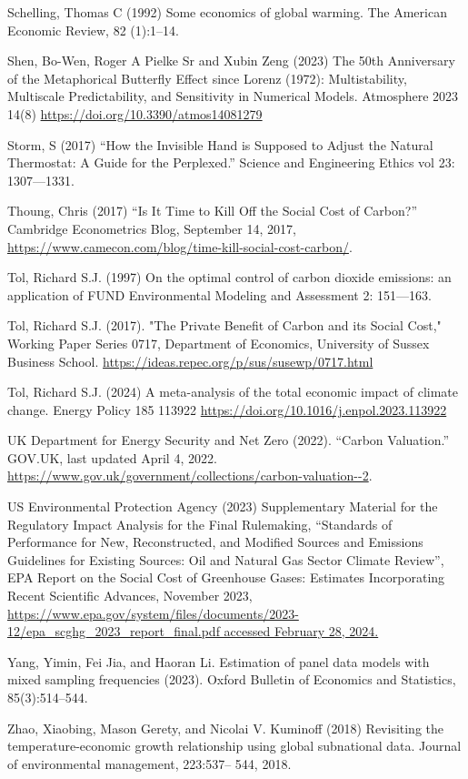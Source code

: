 \documentclass[12pt,paper=a4,DIV=12,parskip=never,chapterprefix=false,headings=standardclasses]{scrreprt}
\begin{document}
Schelling, Thomas C (1992) Some economics of global warming. The American Economic Review, 82
(1):1–14.

Shen, Bo-Wen, Roger A Pielke Sr and Xubin Zeng (2023) The 50th Anniversary of the Metaphorical
Butterfly Effect since Lorenz (1972): Multistability, Multiscale Predictability, and Sensitivity in
Numerical Models. Atmosphere 2023 14(8) \url{https://doi.org/10.3390/atmos14081279}

Storm, S (2017) “How the Invisible Hand is Supposed to Adjust the Natural Thermostat: A Guide for the
Perplexed.” Science and Engineering Ethics vol 23: 1307—1331.

Thoung, Chris (2017) “Is It Time to Kill Off the Social Cost of Carbon?” Cambridge Econometrics Blog,
September 14, 2017, \url{https://www.camecon.com/blog/time-kill-social-cost-carbon/}.

Tol, Richard S.J. (1997) On the optimal control of carbon dioxide emissions: an application of FUND
Environmental Modeling and Assessment 2: 151—163.

Tol, Richard S.J. (2017). "The Private Benefit of Carbon and its Social Cost," Working Paper Series 0717, Department of Economics, University of Sussex Business School.
\url{https://ideas.repec.org/p/sus/susewp/0717.html}

Tol, Richard S.J. (2024) A meta-analysis of the total economic impact of climate change. Energy Policy
185 113922 \url{https://doi.org/10.1016/j.enpol.2023.113922}

UK Department for Energy Security and Net Zero (2022). “Carbon Valuation.” GOV.UK, last updated
April 4, 2022. \url{https://www.gov.uk/government/collections/carbon-valuation--2}.

US Environmental Protection Agency (2023) Supplementary Material for the Regulatory Impact Analysis
for the Final Rulemaking, “Standards of Performance for New, Reconstructed, and Modified Sources
and Emissions Guidelines for Existing Sources: Oil and Natural Gas Sector Climate Review”, EPA
Report on the Social Cost of Greenhouse Gases: Estimates Incorporating Recent Scientific Advances,
November 2023, \url{https://www.epa.gov/system/files/documents/2023-
12/epa_scghg_2023_report_final.pdf accessed February 28, 2024.}

Yang, Yimin, Fei Jia, and Haoran Li. Estimation of panel data models with mixed sampling frequencies
(2023). Oxford Bulletin of Economics and Statistics, 85(3):514–544.

Zhao, Xiaobing, Mason Gerety, and Nicolai V. Kuminoff (2018) Revisiting the temperature-economic
growth relationship using global subnational data. Journal of environmental management, 223:537–
544, 2018.
\end{document}
